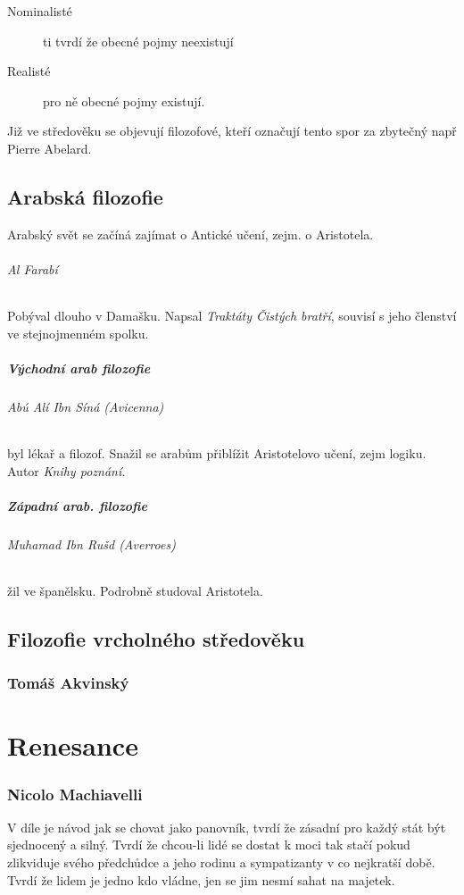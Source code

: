 \documentclass[10pt,a4paper,
twoside,%
]{report}
\begin{document}
\begin{description}
  \item[Nominalisté] ti tvrdí že obecné pojmy neexistují 
  \item[Realisté] pro ně obecné pojmy existují. 
\end{description}

Již ve středověku se objevují filozofové, kteří označují tento spor za zbytečný např \textsf{Pierre Abelard.}

\section{Arabská filozofie}

Arabský svět se začíná zajímat o Antické učení, zejm. o Aristotela. 

\subparagraph{Al Farabí} Pobýval dlouho v Damašku. Napsal \emph{Traktáty Čistých bratří}, souvisí s jeho členství ve stejnojmenném spolku. 

\paragraph{Východní arab filozofie }

\subparagraph{Abú Alí Ibn Síná (\emph{Avicenna})} byl lékař a filozof. Snažil se arabům přiblížit Aristotelovo učení, zejm logiku. Autor \emph{Knihy poznání.}

\paragraph{Západní arab. filozofie}

\subparagraph{Muhamad Ibn Rušd (\emph{Averroes})} žil ve španělsku. Podrobně studoval Aristotela.

\section{Filozofie vrcholného středověku}

\subsection{Tomáš Akvinský}

\chapter{Renesance}

\subsection{Nicolo Machiavelli}
V díle je návod jak se chovat jako panovník, tvrdí že zásadní pro každý stát být sjednocený a silný. Tvrdí že chcou-li lidé se dostat k moci tak stačí pokud zlikviduje svého předchůdce a jeho rodinu a sympatizanty v co nejkratší době. Tvrdí že lidem je jedno kdo vládne, jen se jim nesmí sahat na majetek. 
\end{document}
